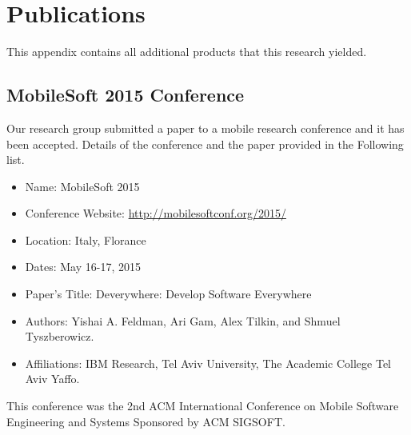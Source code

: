 \chapter{Publications}
This appendix contains all additional products that this research yielded.

\section{MobileSoft 2015 Conference}
Our research group submitted a paper to a mobile research conference and it has been accepted. Details of the conference and the paper provided in the Following list.
\begin{itemize}
	\item Name: MobileSoft 2015
	\item Conference Website: \url{http://mobilesoftconf.org/2015/}
	\item Location: Italy, Florance
	\item Dates: May 16-17, 2015
	\item Paper's Title: Deverywhere: Develop Software Everywhere
	\item Authors: Yishai A. Feldman, Ari Gam, Alex Tilkin, and Shmuel Tyszberowicz.
	\item Affiliations: IBM Research, Tel Aviv University, The Academic College Tel Aviv Yaffo.
\end{itemize}
This conference was the 2nd ACM International Conference on Mobile Software Engineering and Systems Sponsored by ACM SIGSOFT.
